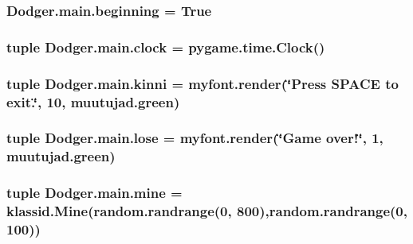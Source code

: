 \subsubsection[{beginning}]{\setlength{\rightskip}{0pt plus 5cm}Dodger.\+main.\+beginning = True}\label{namespace_dodger_1_1main_a53770c6e2fd58e07592f4ac4dca29689}
\hypertarget{namespace_dodger_1_1main_a688c4b7dc0b19589a3f62d27a0233a7f}{}
\subsubsection[{clock}]{\setlength{\rightskip}{0pt plus 5cm}tuple Dodger.\+main.\+clock = pygame.\+time.\+Clock()}\label{namespace_dodger_1_1main_a688c4b7dc0b19589a3f62d27a0233a7f}
\hypertarget{namespace_dodger_1_1main_abc3f766e093308afeae4bb11717428ee}{}
\subsubsection[{kinni}]{\setlength{\rightskip}{0pt plus 5cm}tuple Dodger.\+main.\+kinni = myfont.\+render(\char`\"{}Press S\+P\+A\+C\+E to exit.\char`\"{}, 10, muutujad.\+green)}\label{namespace_dodger_1_1main_abc3f766e093308afeae4bb11717428ee}
\hypertarget{namespace_dodger_1_1main_a6c470cdcf880300fb28ae58cf38bfb92}{}
\subsubsection[{lose}]{\setlength{\rightskip}{0pt plus 5cm}tuple Dodger.\+main.\+lose = myfont.\+render(\char`\"{}Game over!\char`\"{}, 1, muutujad.\+green)}\label{namespace_dodger_1_1main_a6c470cdcf880300fb28ae58cf38bfb92}
\hypertarget{namespace_dodger_1_1main_a9ce66d4a60e19c14f89b870a580099e4}{}
\subsubsection[{mine}]{\setlength{\rightskip}{0pt plus 5cm}tuple Dodger.\+main.\+mine = {\bf klassid.\+Mine}(random.\+randrange(0, 800),random.\+randrange(0, 100))}\label{namespace_dodger_1_1main_a9ce66d4a60e19c14f89b870a580099e4}
\hypertarget{namespace_dodger_1_1main_a5a2e204b9d9a091c33208dd3657e1307}{}
